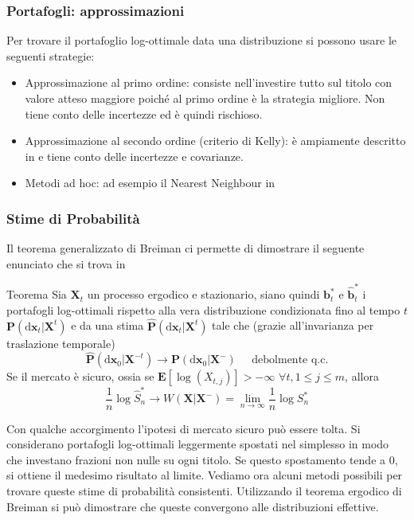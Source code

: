 \documentclass{beamer}
\theoremstyle{plain}
\theoremstyle{definition}
\theoremstyle{remark}
\newcommand{\dX}{\text{d}\bm{x}}
\newcommand{\X}{\bm{X}}
\newcommand{\B}{\bm{b}}
\newcommand{\Pro}{\mathbf{P}}
\newcommand{\E}{\mathbf{E}}
\newcommand{\bh}{\hat{\bm{b}}}
\newcommand{\Sh}{\hat{S}}
\newcommand{\Ph}{\hat{\mathbf{P}}}
\begin{document}
\begin{frame}
\frametitle{Portafogli: approssimazioni}
Per trovare il portafoglio log-ottimale data una distribuzione si possono usare le seguenti strategie:
\begin{itemize}
\item Approssimazione al primo ordine: consiste nell'investire tutto sul titolo con valore atteso maggiore poiché al primo ordine è la strategia migliore. Non tiene conto delle incertezze ed è quindi rischioso.
\item Approssimazione al secondo ordine (criterio di Kelly): è ampiamente descritto in \cite{ThorpKelly} e tiene conto delle incertezze e covarianze.
\item Metodi ad hoc: ad esempio il Nearest Neighbour in \cite{NN}
\end{itemize}
\end{frame}

\begin{frame}
\frametitle{Stime di Probabilità}
Il teorema generalizzato di Breiman ci permette di dimostrare il seguente enunciato che si trova in \cite{algoet1992}
\begin{block}{Teorema}
Sia $\X_t$ un processo ergodico e stazionario, siano quindi $\B^*_t$ e $\bh_t^*$ i portafogli log-ottimali rispetto alla vera distribuzione condizionata fino al tempo $t$ $\Pro(\dX_t|\X^t)$ e da una stima $\Ph(\dX_t|\X^t)$ tale che (grazie all'invarianza per traslazione temporale)
\begin{equation*}
\Ph(\dX_0|\X^{-t})\rightarrow \Pro(\dX_0|\X^{-}) \;\;\;\;\; \text{debolmente q.c.}
\end{equation*}
Se il mercato è sicuro, ossia se $\E[\log(X_{t,j})]>-\infty$ $\forall t,1\leq j\leq m$, allora
\begin{equation*}
\frac{1}{n}\log\Sh^*_n\rightarrow W(\X|\X^{-})=\lim\limits_{n\to\infty}\frac{1}{n}\log S^*_n
\end{equation*}
\end{block}
\end{frame}

\begin{frame}
Con qualche accorgimento l'ipotesi di mercato sicuro può essere tolta. Si considerano portafogli log-ottimali leggermente spostati nel simplesso in modo che investano frazioni non nulle su ogni titolo. Se questo spostamento tende a $0$, si ottiene il medesimo risultato al limite.\newline
Vediamo ora alcuni metodi possibili per trovare queste stime di probabilità consistenti. Utilizzando il teorema ergodico di Breiman si può dimostrare che queste convergono alle distribuzioni effettive.
\end{frame}
\end{document}
